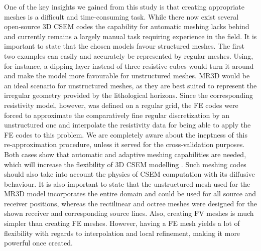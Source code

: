 \documentclass[a4paper, extra, camera,%
]{gji}
\begin{document}
One of the key insights we gained from this study is that creating appropriate meshes is a difficult and time-consuming task. While there now exist several open-source 3D CSEM codes the capability for automatic meshing lacks behind and currently remains a largely manual task requiring experience in the field. It is important to state that the chosen models favour structured meshes. The first two examples can easily and accurately be represented by regular meshes. Using, for instance, a dipping layer instead of three resistive cubes would turn it around and make the model more favourable for unstructured meshes. MR3D would be an ideal scenario for unstructured meshes, as they are best suited to represent the irregular geometry provided by the lithological horizons. Since the corresponding resistivity model, however, was defined on a regular grid, the FE codes were forced to approximate the comparatively fine regular discretization by an unstructured one and interpolate the resistivity data for being able to apply the FE codes to this problem. We are completely aware about the ineptness of this re-approximation procedure, unless it served for the cross-validation purposes. Both cases show that automatic and adaptive meshing capabilities are needed, which will increase the flexibility of 3D CSEM modelling \citep{GJI.11.Schwarzbach,GJI.16.Key,GJI.19.CastilloReyes}. Such meshing codes should also take into account the physics of CSEM computation with its diffusive behaviour. It is also important to state that the unstructured mesh used for the MR3D model incorporates the entire domain and could be used for all source and receiver positions, whereas the rectilinear and octree meshes were designed for the shown receiver and corresponding source lines. Also, creating FV meshes is much simpler than creating FE meshes. However, having a FE mesh yields a lot of flexibility with regards to interpolation and local refinement, making it more powerful once created.
\end{document}
